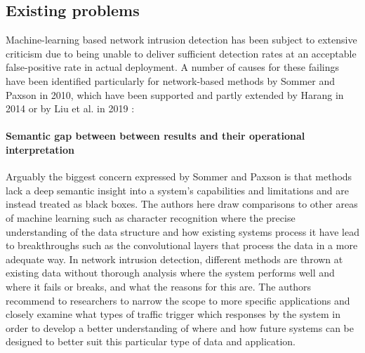 \documentclass{article}
\begin{document}
\subsection{Existing problems}

Machine-learning based network intrusion detection has been subject to extensive criticism due to being unable to deliver sufficient detection rates at an acceptable false-positive rate in actual deployment. A number of causes for these failings have been identified particularly for network-based methods by Sommer and Paxson \cite{sommer2010outside} in 2010, which have been supported and partly extended by Harang \cite{harang2014bridging} in 2014 or by Liu et al. in 2019 \cite{liu2019machine}:


\paragraph{Semantic gap between between results and their operational interpretation}

Arguably the biggest concern expressed by Sommer and Paxson is that methods lack a deep semantic insight into a system's capabilities and limitations and are instead treated as black boxes. The authors here draw comparisons to other areas of machine learning such as character recognition where the precise understanding of the data structure and how existing systems process it have lead to breakthroughs such as the convolutional layers that process the data in a more adequate way. In network intrusion detection, different methods are thrown at existing data without thorough analysis where the system performs well and where it fails or breaks, and what the reasons for this are. The authors recommend to researchers to narrow the scope to more specific applications and closely examine what types of traffic trigger which responses by the system in order to develop a better understanding of where and how future systems can be designed to better suit this particular type of data and application. 


%
%
%
%
%
\end{document}
